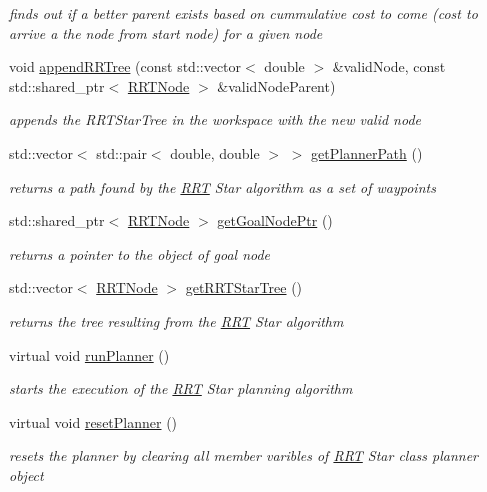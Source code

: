 \begin{DoxyCompactItemize}
\begin{DoxyCompactList}\small\item\em finds out if a better parent exists based on cummulative cost to come (cost to arrive a the node from start node) for a given node \end{DoxyCompactList}\item 
void \hyperlink{classRRTStar_a3b1f7e66c99881faa190034b0ff2b101}{append\+R\+R\+Tree} (const std\+::vector$<$ double $>$ \&valid\+Node, const std\+::shared\+\_\+ptr$<$ \hyperlink{classRRTNode}{R\+R\+T\+Node} $>$ \&valid\+Node\+Parent)
\begin{DoxyCompactList}\small\item\em appends the R\+R\+T\+Star\+Tree in the workspace with the new valid node \end{DoxyCompactList}\item 
std\+::vector$<$ std\+::pair$<$ double, double $>$ $>$ \hyperlink{classRRTStar_a9d415973b5fbafa4435203fb56ac3357}{get\+Planner\+Path} ()
\begin{DoxyCompactList}\small\item\em returns a path found by the \hyperlink{classRRT}{R\+RT} Star algorithm as a set of waypoints \end{DoxyCompactList}\item 
std\+::shared\+\_\+ptr$<$ \hyperlink{classRRTNode}{R\+R\+T\+Node} $>$ \hyperlink{classRRTStar_a859d863be7b83876119f89b8bc8c671e}{get\+Goal\+Node\+Ptr} ()
\begin{DoxyCompactList}\small\item\em returns a pointer to the object of goal node \end{DoxyCompactList}\item 
std\+::vector$<$ \hyperlink{classRRTNode}{R\+R\+T\+Node} $>$ \hyperlink{classRRTStar_ad63c0ccb78ae3bbd9c4e8b58f6299abe}{get\+R\+R\+T\+Star\+Tree} ()
\begin{DoxyCompactList}\small\item\em returns the tree resulting from the \hyperlink{classRRT}{R\+RT} Star algorithm \end{DoxyCompactList}\item 
virtual void \hyperlink{classRRTStar_a5018db145f3a5bb5b4a13b710009ae55}{run\+Planner} ()
\begin{DoxyCompactList}\small\item\em starts the execution of the \hyperlink{classRRT}{R\+RT} Star planning algorithm \end{DoxyCompactList}\item 
virtual void \hyperlink{classRRTStar_a713736e18edd589d262dd4c2efc1e18d}{reset\+Planner} ()
\begin{DoxyCompactList}\small\item\em resets the planner by clearing all member varibles of \hyperlink{classRRT}{R\+RT} Star class planner object \end{DoxyCompactList}\end{DoxyCompactItemize}
